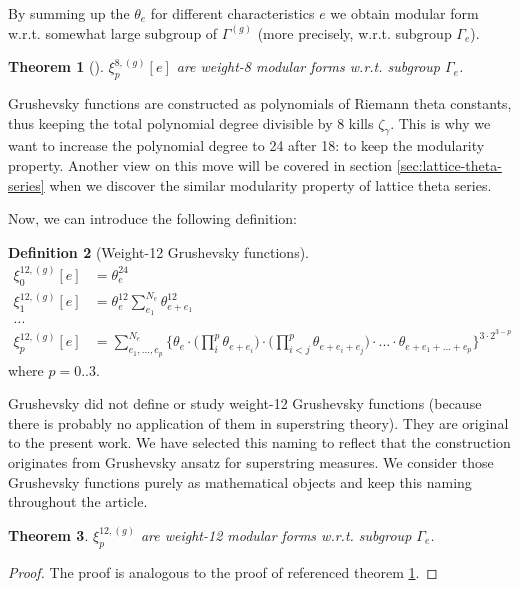 \documentclass{article}
\theoremstyle{plain}
\newtheorem{theorem}{Theorem}[section]
\theoremstyle{definition}
\newtheorem{definition}[theorem]{Definition}
\begin{document}
By summing up the $\theta_e$ for different characteristics $e$ 
we obtain modular form w.r.t. somewhat large subgroup of $\Gamma^{(g)}$ 
(more precisely, w.r.t. subgroup $\Gamma_e$).

\begin{theorem}[\cite{morozov}]\label{thm:xi-8-are-modular}
    $\xi_{p}^{8, (g)}[e]$
    are weight-8 modular forms w.r.t. subgroup $\Gamma_e$.
\end{theorem}

Grushevsky functions are constructed as polynomials of Riemann theta constants, 
thus keeping the total polynomial degree divisible by 8 kills $\zeta_\gamma$.
This is why we want to increase the polynomial degree to 24 after 18: 
to keep the modularity property.
Another view on this move will be covered in section \ref{sec:lattice-theta-series} when we discover
the similar modularity property of lattice theta series.

Now, we can introduce the following definition:

\begin{definition}[Weight-12 Grushevsky functions]
    \begin{align}
        \xi_0^{12, (g)}[e] &= \theta^{24}_e \\
        \xi_1^{12, (g)}[e] &= \theta^{12}_e \sum_{e_1}^{N_e} \theta^{12}_{e+e_1} \\
        ... \nonumber \\
        \xi_p^{12, (g)}[e] &= \sum_{e_1, ..., e_p}^{N_e} \Bigg \{
            \theta_e 
            \cdot \Big( \prod_i^p \theta_{e + e_i} \Big)
            \cdot \Big( \prod_{i < j}^p \theta_{e + e_i + e_j} \Big) \cdot ...
            \cdot \theta_{e + e_1 + ... + e_p}
        \Bigg \} ^ {3 \cdot 2^{3 - p}}
    \end{align}
    where $p=0..3$.
\end{definition}

Grushevsky did not define or study weight-12 Grushevsky functions 
(because there is probably no 
application of them in superstring theory). They are original to the present work.
We have selected this naming to reflect that the construction originates from Grushevsky ansatz for
superstring measures.
We consider those Grushevsky functions purely as mathematical objects
and keep this naming throughout the article.

\begin{theorem}
    $\xi_{p}^{12, (g)}$ are weight-12 modular forms w.r.t. subgroup $\Gamma_e$.
\end{theorem}
\begin{proof}
    The proof is analogous to the proof of referenced theorem \ref{thm:xi-8-are-modular}.
\end{proof}
\end{document}
